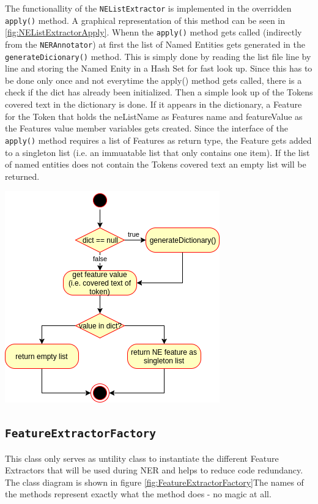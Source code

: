 \documentclass[11pt, english]{article}
\begin{document}
The functionallity of the \verb/NEListExtractor/ is implemented in the overridden \verb/apply()/ method. A graphical representation of this method can be seen in \ref{fig:NEListExtractorApply}. Whenn the \verb/apply()/ method gets called (indirectly from the \verb/NERAnnotator/) at first the list of Named Entities gets generated in the \verb/generateDicionary()/ method. This is simply done by reading the list file line by line and storing the Named Enity in a Hash Set for fast look up. Since this has to be done only once and not everytime the apply() method gets called, there is a check if the dict has already been initialized. Then a simple look up of the Tokens covered text in the dictionary is done. If it appears in the dictionary, a Feature for the Token that holds the neListName as Features name and featureValue as the Features value member variables gets created. Since the interface of the \verb/apply()/ method requires a list of Features as return type, the Feature gets added to a singleton list (i.e. an immuatable list that only contains one item). If the list of named entities does not contain the Tokens covered text an empty list will be returned.

\includegraphics[scale=0.75]{gfx/apply.png}
\label{fig:NEListExtractorApply}

\subsection{\texttt{FeatureExtractorFactory}}
\label{sec:FeatureExtractorFactory}
This class only serves as untility class to instantiate the different Feature Extractors that will be used during NER and helps to reduce code redundancy. The class diagram is shown in figure \ref{fig:FeatureExtractorFactory}The names of the methods represent exactly what the method does - no magic at all.
\end{document}
